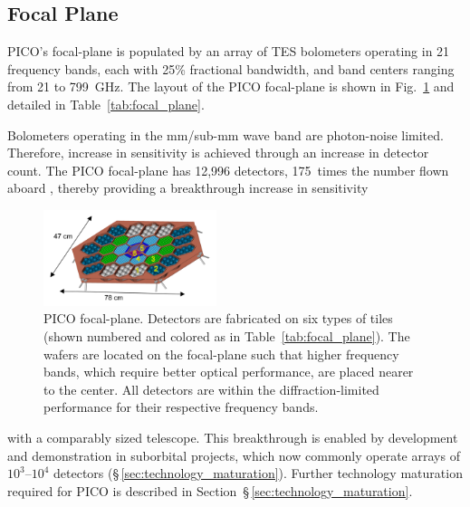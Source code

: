 
\subsection{Focal Plane}
\label{sec:focal_plane} %
%


PICO's focal-plane is populated by an array of \ac{TES} bolometers operating in 21 frequency bands, each with 25\% fractional bandwidth, and band centers ranging from 21 to 799~GHz. 
The layout of the PICO focal-plane is shown in Fig.~\ref{fig:FocalPlaneMechanical} and detailed in Table~\ref{tab:focal_plane}. 

Bolometers operating in the mm/sub-mm wave band are photon-noise limited. Therefore, increase in sensitivity is achieved through an increase in detector count. The PICO focal-plane has 12,996 detectors, 175~times the number flown aboard \planck , thereby providing a breakthrough increase in sensitivity
\begin{figure}
\vskip -8pt
\hfill
\includegraphics[width=0.45\textwidth]{figures/FocalPlaneMechanical.png}
\vskip -2pt
\caption{\captiontext PICO focal-plane. Detectors are fabricated on six types of tiles (shown numbered and colored as in Table~\ref{tab:focal_plane}). The wafers are located on the focal-plane such that higher frequency bands, which require better optical performance, are placed nearer to the center. All detectors are within the diffraction-limited performance for their respective frequency bands.  
\label{fig:FocalPlaneMechanical}}
\end{figure}
with a comparably sized telescope. This breakthrough is enabled by development and demonstration in suborbital projects, which now commonly operate arrays of $10^3$--$10^4$ detectors (\S\,\ref{sec:technology_maturation}). Further technology maturation required for PICO is described in Section~\S\,\ref{sec:technology_maturation}.

